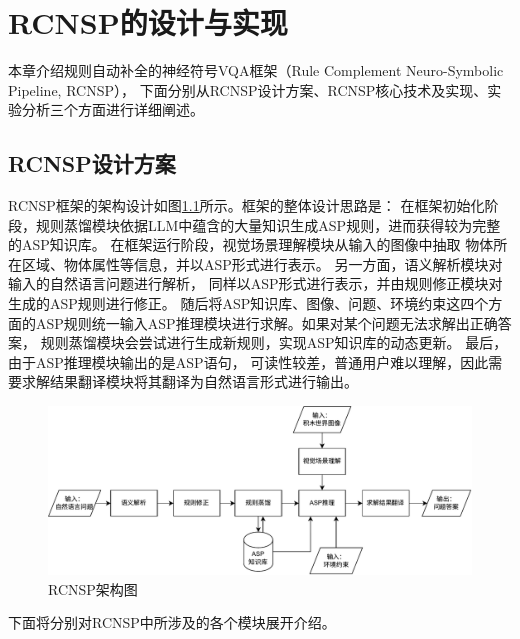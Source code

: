 \chapter{RCNSP的设计与实现}
本章介绍规则自动补全的神经符号VQA框架（Rule Complement Neuro-Symbolic Pipeline, RCNSP），
下面分别从RCNSP设计方案、RCNSP核心技术及实现、实验分析三个方面进行详细阐述。
\section{RCNSP设计方案}
RCNSP框架的架构设计如图\ref{fig:pipeline}所示。框架的整体设计思路是：
在框架初始化阶段，规则蒸馏模块依据LLM中蕴含的大量知识生成ASP规则，进而获得较为完整的ASP知识库。
在框架运行阶段，视觉场景理解模块从输入的图像中抽取
物体所在区域、物体属性等信息，并以ASP形式进行表示。
另一方面，语义解析模块对输入的自然语言问题进行解析，
同样以ASP形式进行表示，并由规则修正模块对生成的ASP规则进行修正。
随后将ASP知识库、图像、问题、环境约束这四个方面的ASP规则统一输入ASP推理模块进行求解。如果对某个问题无法求解出正确答案，
规则蒸馏模块会尝试进行生成新规则，实现ASP知识库的动态更新。
最后，由于ASP推理模块输出的是ASP语句，
可读性较差，普通用户难以理解，因此需要求解结果翻译模块将其翻译为自然语言形式进行输出。
\begin{figure}[h]
    \centering
    \includegraphics[width=\textwidth]{figures/pipeline-crop.pdf}
    \caption{RCNSP架构图}
    \label{fig:pipeline}
\end{figure}
下面将分别对RCNSP中所涉及的各个模块展开介绍。
